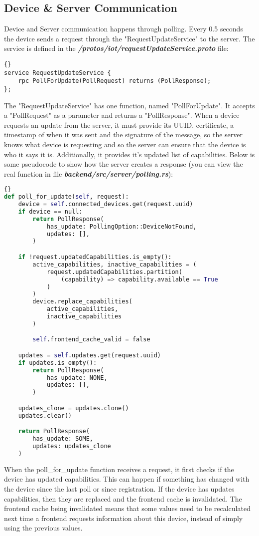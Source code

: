 \subsection{Device \& Server Communication}
Device and Server communication happens through polling. Every 0.5 seconds the device sends a request through the "RequestUpdateService" to the server. The service is defined in the \textit{\textbf{/protos/iot/requestUpdateService.proto}} file:
\begin{lstlisting}[language=protobuf3, style=boxed, showstringspaces=false]{}
service RequestUpdateService {
    rpc PollForUpdate(PollRequest) returns (PollResponse);
};
\end{lstlisting}
The "RequestUpdateService" has one function, named "PollForUpdate". It accepts a "PollRequest" as a parameter and returns a "PollResponse". When a device requests an update from the server, it must provide its UUID, certificate, a timestamp of when it was sent and the signature of the message, so the server knows what device is requesting and so the server can ensure that the device is who it says it is. Additionally, it provides it's updated list of capabilities. Below is some pseudocode to show how the server creates a response (you can view the real function in file \textit{\textbf{backend/src/server/polling.rs}}): 

\begin{lstlisting}[language=Python, style=boxed, showstringspaces=false]{}
def poll_for_update(self, request):
    device = self.connected_devices.get(request.uuid)
    if device == null:
        return PollResponse(
            has_update: PollingOption::DeviceNotFound,
            updates: [],
        )

    if !request.updatedCapabilities.is_empty():
        active_capabilities, inactive_capabilities = (
            request.updatedCapabilities.partition(
                (capability) => capability.available == True
            )
        )
        device.replace_capabilities(
            active_capabilities,
            inactive_capabilities
        )

        self.frontend_cache_valid = false

    updates = self.updates.get(request.uuid)
    if updates.is_empty():
        return PollResponse(
            has_update: NONE,
            updates: [],
        )

    updates_clone = updates.clone()
    updates.clear()

    return PollResponse(
        has_update: SOME,
        updates: updates_clone
    )
\end{lstlisting}
When the poll\_for\_update function receives a request, it first checks if the device has updated capabilities. This can happen if something has changed with the device since the last poll or since registration. If the device has updates capabilities, then they are replaced and the frontend cache is invalidated. The frontend cache being invalidated means that some values need to be recalculated next time a frontend requests information about this device, instead of simply using the previous values.

